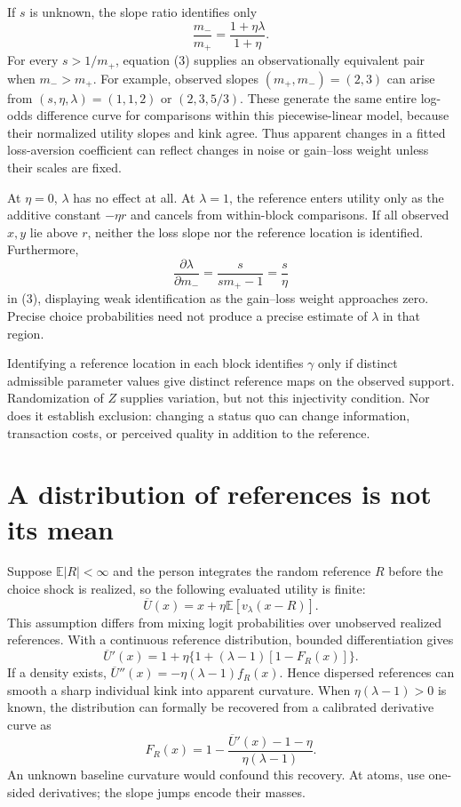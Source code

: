 \documentclass[11pt]{article}
\newcommand{\E}{\mathbb E}
\begin{document}
If $s$ is unknown, the slope ratio identifies only
\[
 \frac{m_-}{m_+}=\frac{1+\eta\lambda}{1+\eta}.
\]
For every $s>1/m_+$, equation (3) supplies an observationally equivalent pair when $m_->m_+$. For example, observed slopes $(m_+,m_-)=(2,3)$ can arise from $(s,\eta,\lambda)=(1,1,2)$ or $(2,3,5/3)$. These generate the same entire log-odds difference curve for comparisons within this piecewise-linear model, because their normalized utility slopes and kink agree. Thus apparent changes in a fitted loss-aversion coefficient can reflect changes in noise or gain--loss weight unless their scales are fixed.

At $\eta=0$, $\lambda$ has no effect at all. At $\lambda=1$, the reference enters utility only as the additive constant $-\eta r$ and cancels from within-block comparisons. If all observed $x,y$ lie above $r$, neither the loss slope nor the reference location is identified. Furthermore,
\[
 \frac{\partial\lambda}{\partial m_-}=\frac{s}{s m_+-1}=\frac{s}{\eta}
\]
in (3), displaying weak identification as the gain--loss weight approaches zero. Precise choice probabilities need not produce a precise estimate of $\lambda$ in that region.

Identifying a reference location in each block identifies $\gamma$ only if distinct admissible parameter values give distinct reference maps on the observed support. Randomization of $Z$ supplies variation, but not this injectivity condition. Nor does it establish exclusion: changing a status quo can change information, transaction costs, or perceived quality in addition to the reference.

\section*{A distribution of references is not its mean}
Suppose $\E|R|<\infty$ and the person integrates the random reference $R$ before the choice shock is realized, so the following evaluated utility is finite:
\[
 \overline U(x)=x+\eta\E[v_\lambda(x-R)].                    \tag{4}
\]
This assumption differs from mixing logit probabilities over unobserved realized references. With a continuous reference distribution, bounded differentiation gives
\[
 \overline U'(x)=1+\eta\{1+(\lambda-1)[1-F_R(x)]\}.          \tag{5}
\]
If a density exists, $\overline U''(x)=-\eta(\lambda-1)f_R(x)$. Hence dispersed references can smooth a sharp individual kink into apparent curvature. When $\eta(\lambda-1)>0$ is known, the distribution can formally be recovered from a calibrated derivative curve as
\[
 F_R(x)=1-\frac{\overline U'(x)-1-\eta}{\eta(\lambda-1)}.
\]
An unknown baseline curvature would confound this recovery. At atoms, use one-sided derivatives; the slope jumps encode their masses.
\end{document}
